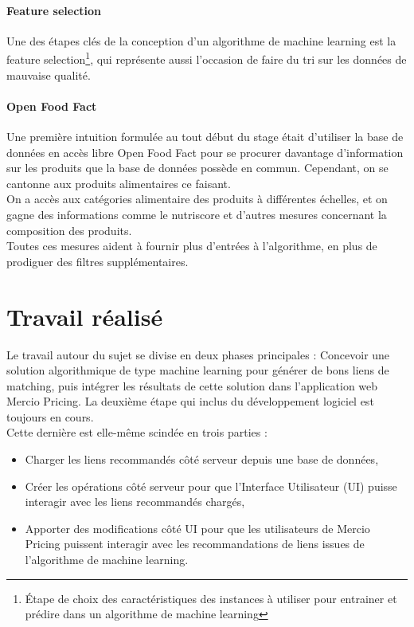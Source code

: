 \documentclass{rapportCS}
\begin{document}
\paragraph{Feature selection}
Une des étapes clés de la conception d'un algorithme de machine learning est la feature selection\footnote[5]{Étape
de choix des caractéristiques des instances à utiliser pour entrainer et prédire dans un algorithme de machine learning}, 
qui représente aussi l'occasion de faire du tri sur les données de mauvaise qualité.  

\paragraph{Open Food Fact}
Une première intuition formulée au tout début du stage était d'utiliser la base de données en accès libre
Open Food Fact pour se procurer davantage d'information sur les produits que la base de données possède en commun.
Cependant, on se cantonne aux produits alimentaires ce faisant.\\

On a accès aux catégories alimentaire des produits à différentes échelles, et on gagne des informations comme
le nutriscore et d'autres mesures concernant la composition des produits.\\
Toutes ces mesures aident à fournir plus d'entrées à l'algorithme, en plus de prodiguer des filtres supplémentaires.

\newpage
\section{Travail réalisé}
Le travail autour du sujet se divise en deux phases principales :
Concevoir une solution algorithmique de type machine learning pour générer de bons liens de matching,
puis intégrer les résultats de cette solution dans l'application web Mercio Pricing.
La deuxième étape qui inclus du développement logiciel est toujours en cours.\\
Cette dernière est elle-même scindée en trois parties :
\begin{itemize}
  \item Charger les liens recommandés côté serveur depuis une base de données,
  \item Créer les opérations côté serveur pour que l'Interface Utilisateur (UI)
  puisse interagir avec les liens recommandés chargés,
  \item Apporter des modifications côté UI pour que les utilisateurs de Mercio Pricing
  puissent interagir avec les recommandations de liens issues de l'algorithme de machine learning.
\end{itemize}
\end{document}
